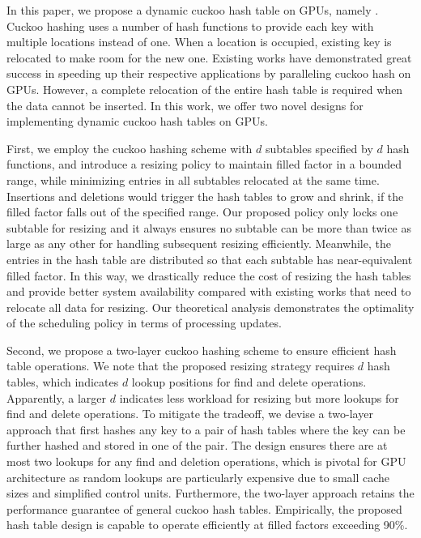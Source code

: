 In this paper, we propose a dynamic cuckoo hash table on GPUs, namely \voter. Cuckoo hashing \cite{pagh2004cuckoo} uses a number of hash functions to provide each key with multiple locations instead of one. When a location is occupied, existing key is relocated to make room for the new one. Existing works \cite{alcantara2009real,alcantara2011building,zhang2015mega,breslow2016horton} have demonstrated great success in speeding up their respective applications by paralleling cuckoo hash on GPUs. 
However, a complete relocation of the entire hash table is required when the data cannot be  inserted.
In this work, we offer two novel designs for implementing dynamic cuckoo hash tables on GPUs.

First, we employ the cuckoo hashing scheme with $d$ subtables specified by $d$ hash functions, and introduce a resizing policy to maintain filled factor in a bounded range, while minimizing entries in all subtables relocated at the same time. Insertions and deletions would trigger the hash tables to grow and shrink, if the filled factor falls out of the specified range. 
Our proposed policy only locks one subtable for resizing and it always ensures no subtable can be more than twice as large as any other for handling subsequent resizing efficiently. Meanwhile, the entries in the hash table are distributed so that each subtable has near-equivalent filled factor.
In this way, we drastically reduce the cost of resizing the hash tables and provide better system availability compared with existing works that need to relocate all data for resizing.
Our theoretical analysis demonstrates the optimality of the scheduling policy in terms of processing updates. 

Second, we propose a two-layer cuckoo hashing scheme to ensure efficient hash table operations. 
We note that the proposed resizing strategy requires $d$ hash tables, which indicates $d$ lookup positions for find and delete operations. Apparently, a larger $d$ indicates less workload for resizing but more lookups for find and delete operations. To mitigate the tradeoff, we devise a two-layer approach that first hashes any key to a pair of hash tables where the key can be further hashed and stored in one of the pair. 
The design ensures there are at most two lookups for any find and deletion operations, which is pivotal for GPU architecture as random lookups are particularly expensive due to small cache sizes and simplified control units.
Furthermore, the two-layer approach retains the performance guarantee of general cuckoo hash tables.
Empirically, the proposed hash table design is capable to operate efficiently at filled factors exceeding 90\%.


